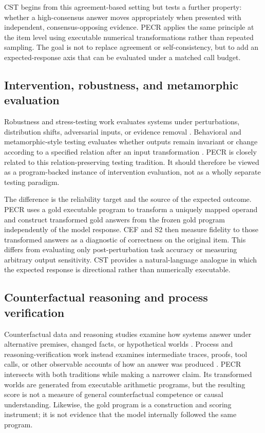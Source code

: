 \documentclass[11pt]{article}
\begin{document}
CST begins from this agreement-based setting but tests a further property: whether a high-consensus answer moves appropriately when presented with independent, consensus-opposing evidence. PECR applies the same principle at the item level using executable numerical transformations rather than repeated sampling. The goal is not to replace agreement or self-consistency, but to add an expected-response axis that can be evaluated under a matched call budget.

\subsection{Intervention, robustness, and metamorphic evaluation}

Robustness and stress-testing work evaluates systems under perturbations, distribution shifts, adversarial inputs, or evidence removal \citep{ribeiro-etal-2020-beyond,naik-etal-2018-stress,jia-liang-2017-adversarial}. Behavioral and metamorphic-style testing evaluates whether outputs remain invariant or change according to a specified relation after an input transformation \citep{ribeiro-etal-2020-beyond,naik-etal-2018-stress}. PECR is closely related to this relation-preserving testing tradition. It should therefore be viewed as a program-backed instance of intervention evaluation, not as a wholly separate testing paradigm.

The difference is the reliability target and the source of the expected outcome. PECR uses a gold executable program to transform a uniquely mapped operand and construct transformed gold answers from the frozen gold program independently of the model response. CEF and S2 then measure fidelity to those transformed answers as a diagnostic of correctness on the original item. This differs from evaluating only post-perturbation task accuracy or measuring arbitrary output sensitivity. CST provides a natural-language analogue in which the expected response is directional rather than numerically executable.

\subsection{Counterfactual reasoning and process verification}

Counterfactual data and reasoning studies examine how systems answer under alternative premises, changed facts, or hypothetical worlds \citep{kaushik-etal-2019-counterfactually-augmented}. Process and reasoning-verification work instead examines intermediate traces, proofs, tool calls, or other observable accounts of how an answer was produced \citep{lightman-etal-2023-verify-step}. PECR intersects with both traditions while making a narrower claim. Its transformed worlds are generated from executable arithmetic programs, but the resulting score is not a measure of general counterfactual competence or causal understanding. Likewise, the gold program is a construction and scoring instrument; it is not evidence that the model internally followed the same program.
\end{document}
